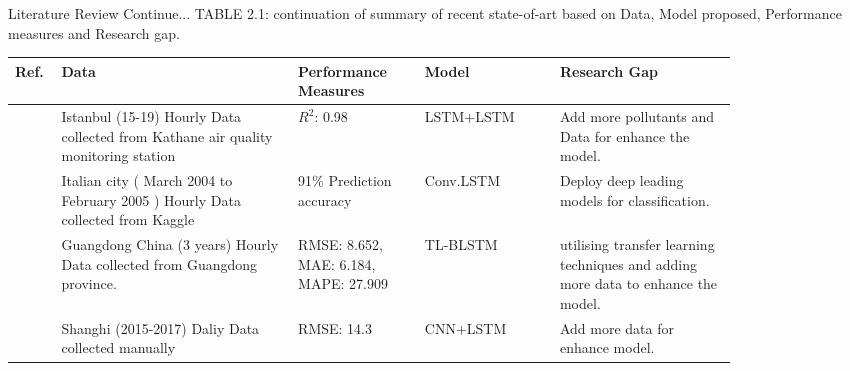 \documentclass[12pt, aspectratio=169]{beamer}
\begin{document}
\begin{frame}{Literature Review  \tiny{Continue...}}
	\centering
	\scriptsize {TABLE 2.1: continuation of summary of recent state-of-art based on Data,  Model proposed,  Performance measures and Research gap.}\\
	\begin{table}
		\centering
		\begin{tabular}{|p{0.03\linewidth}|p{0.29\linewidth}|p{0.15\linewidth}|p{0.16\linewidth}|p{0.21\linewidth}|}
			\hline
			\footnotesize \textbf {Ref.} & \footnotesize \textbf { Data} & \footnotesize \textbf {Performance Measures } & \footnotesize \textbf {Model} & \footnotesize \textbf {Research Gap }  \\ \hline
			\scriptsize  \cite{eren2023predicting}         \scriptsize & Istanbul (15-19) Hourly Data collected from Kathane air quality monitoring station                     \scriptsize & $R^2$:  0.98                                                                                               \scriptsize & LSTM+LSTM                                                           \scriptsize & Add more pollutants and Data for enhance the model.           \\\hline
			\scriptsize \cite{zhu2023deep}           \scriptsize & Italian city ( March 2004 to   February 2005 ) Hourly Data collected from Kaggle \scriptsize & 91\% Prediction accuracy \scriptsize & Conv.LSTM                                                           \scriptsize & Deploy deep leading models for classification.  \\\hline
			\scriptsize \cite{ma2019improving}               \scriptsize & Guangdong China (3 years) Hourly   Data collected from Guangdong province.                               \scriptsize & RMSE: 8.652,  MAE: 6.184,    MAPE: 27.909                                                                   \scriptsize & TL-BLSTM                                                            \scriptsize & utilising transfer learning techniques and adding more data to enhance the model.     \\\hline
			\scriptsize \cite{qin2019novel}       \scriptsize & Shanghi (2015-2017) Daliy Data collected   manually  \scriptsize & RMSE:  14.3   \scriptsize & CNN+LSTM     \scriptsize &  Add more data for enhance model. \\\hline
			\end{tabular}
	\end{table}
\end{frame}
\end{document}
